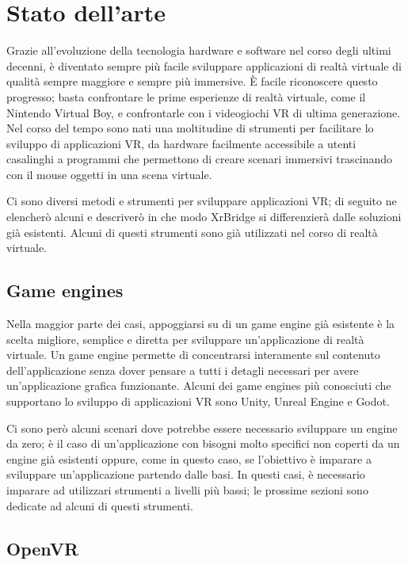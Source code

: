 \documentclass[twoside]{supsistudent}
\begin{document}

\chapter{Stato dell'arte}

Grazie all'evoluzione della tecnologia hardware e software nel corso degli ultimi decenni, è diventato sempre più facile sviluppare applicazioni di realtà virtuale di qualità sempre maggiore e sempre più immersive. È facile riconoscere questo progresso; basta confrontare le prime esperienze di realtà virtuale, come il Nintendo Virtual Boy, e confrontarle con i videogiochi VR di ultima generazione. Nel corso del tempo sono nati una moltitudine di strumenti per facilitare lo sviluppo di applicazioni VR, da hardware facilmente accessibile a utenti casalinghi a programmi che permettono di creare scenari immersivi trascinando con il mouse oggetti in una scena virtuale.

Ci sono diversi metodi e strumenti per sviluppare applicazioni VR; di seguito ne elencherò alcuni e descriverò in che modo XrBridge si differenzierà dalle soluzioni già esistenti. Alcuni di questi strumenti sono già utilizzati nel corso di realtà virtuale.

\section{Game engines}

Nella maggior parte dei casi, appoggiarsi su di un game engine già esistente è la scelta migliore, semplice e diretta per sviluppare un'applicazione di realtà virtuale. Un game engine permette di concentrarsi interamente sul contenuto dell'applicazione senza dover pensare a tutti i detagli necessari per avere un'applicazione grafica funzionante. Alcuni dei game engines più conosciuti che supportano lo sviluppo di applicazioni VR sono Unity, Unreal Engine e Godot.

Ci sono però alcuni scenari dove potrebbe essere necessario sviluppare un engine da zero; è il caso di un'applicazione con bisogni molto specifici non coperti da un engine già esistenti oppure, come in questo caso, se l'obiettivo è imparare a sviluppare un'applicazione partendo dalle basi. In questi casi, è necessario imparare ad utilizzari strumenti a livelli più bassi; le prossime sezioni sono dedicate ad alcuni di questi strumenti.

\section{OpenVR}
\end{document}
